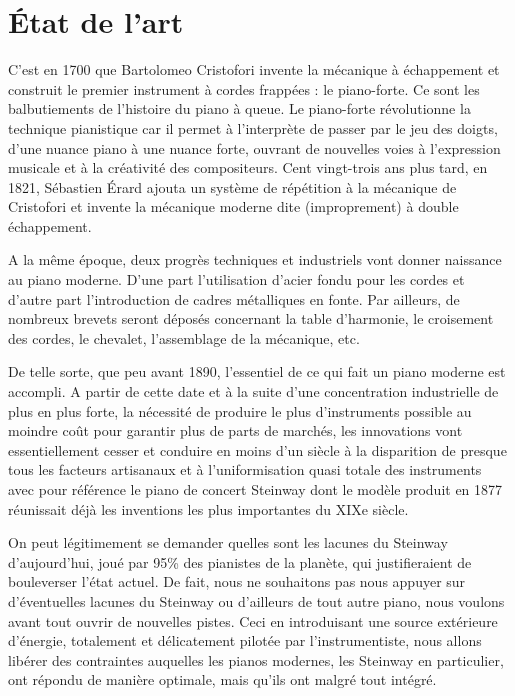 \documentclass[french,a4paper,12pt]{report}
\begin{document}
  \section{État de l'art}
  
  C’est en 1700 que Bartolomeo Cristofori invente la mécanique à échappement et construit le premier instrument à cordes frappées : le piano-forte. Ce sont les balbutiements de l’histoire du piano à queue. Le piano-forte révolutionne la technique pianistique car il permet à l’interprète de passer par le jeu des doigts, d’une nuance piano à une nuance forte, ouvrant de nouvelles voies à l’expression musicale et à la créativité des compositeurs. Cent vingt-trois ans plus tard, en 1821, Sébastien Érard ajouta un système de répétition à la mécanique de Cristofori et invente la mécanique moderne dite (improprement) à double échappement.

A la même époque, deux progrès techniques et industriels vont donner naissance au piano moderne. D’une part l’utilisation d’acier fondu pour les cordes et d’autre part l’introduction de cadres métalliques en fonte. Par ailleurs, de nombreux brevets seront déposés concernant la table d’harmonie, le croisement des cordes, le chevalet, l’assemblage de la mécanique, etc. 

De telle sorte, que peu avant 1890, l’essentiel de ce qui fait un piano moderne est accompli. A partir de cette date et à la suite d’une concentration industrielle de plus en plus forte, la nécessité de produire le plus d’instruments possible au moindre coût pour garantir plus de parts de marchés, les innovations vont essentiellement cesser et conduire en moins d’un siècle à la disparition de presque tous les facteurs artisanaux et à l’uniformisation quasi totale des instruments avec pour référence le piano de concert Steinway dont le modèle produit en 1877 réunissait déjà les inventions les plus importantes du XIXe siècle.

\newpage
On peut légitimement se demander quelles sont les lacunes du Steinway d’aujourd’hui, joué par 95\% des pianistes de la planète, qui justifieraient de bouleverser l’état actuel.
De fait, nous ne souhaitons pas nous appuyer sur d’éventuelles lacunes du Steinway ou d’ailleurs de tout autre piano, nous voulons avant tout ouvrir de nouvelles pistes. 
 Ceci en introduisant une source extérieure d’énergie, totalement et délicatement pilotée par l’instrumentiste, nous allons libérer des contraintes auquelles les pianos modernes, les Steinway en particulier, ont répondu de manière optimale, mais qu’ils ont malgré tout intégré.
 
\end{document}
